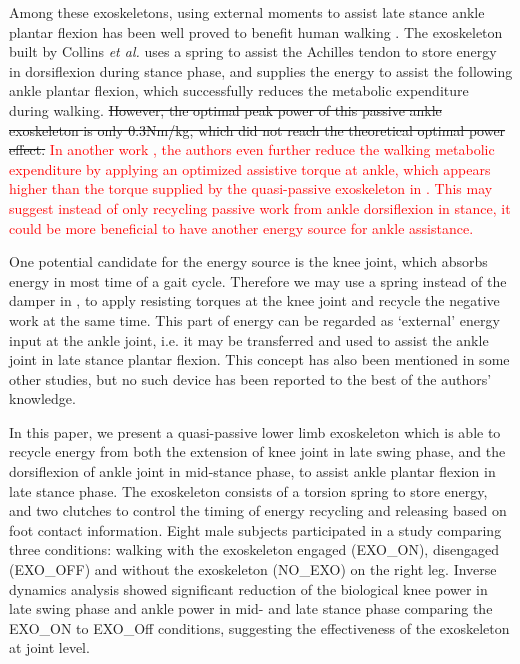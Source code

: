 \documentclass[twocolumn,cleanfoot,10pt]{asme2ej}
\begin{document}
Among these exoskeletons, using external moments to assist late stance ankle plantar flexion has been well proved to benefit human walking \cite{RN5,RN9,RN10,RN11,RN12}.
The exoskeleton built by Collins \emph{et al.}\cite{RN5} uses a spring to assist the Achilles tendon to store energy in dorsiflexion during stance phase, and supplies the energy to assist the following ankle plantar flexion, which successfully reduces the metabolic expenditure during walking.
\sout{However, the optimal peak power of this passive ankle exoskeleton \cite{RN5} is only 0.3Nm/kg, which did not reach the theoretical optimal power effect\cite{zhang2017human}.}
\textcolor{red}{In another work \cite{zhang2017human}, the authors even further reduce the walking metabolic expenditure by applying an optimized assistive torque at ankle, which appears higher than the torque supplied by the quasi-passive exoskeleton in \cite{RN5}.
This may suggest instead of only recycling passive work from ankle dorsiflexion in stance, it could be more beneficial to have another energy source for ankle assistance.}

One potential candidate for the energy source is the knee joint, which absorbs energy in most time of a gait cycle\cite{RN2}.
Therefore we may use a spring instead of the damper in \cite{RN3}, to apply resisting torques at the knee joint and recycle the negative work at the same time.
This part of energy can be regarded as ‘external’ energy input at the ankle joint, i.e. it may be transferred and used to assist the ankle joint in late stance plantar flexion.
This concept has also been mentioned in some other studies\cite{RN3,RN12}, but no such device has been reported to the best of the authors' knowledge.

In this paper, we present a quasi-passive lower limb exoskeleton which is able to recycle energy from both the extension of knee joint in late swing phase, and the dorsiflexion of ankle joint in mid-stance phase, to assist ankle plantar flexion in late stance phase.
The exoskeleton consists of a torsion spring to store energy, and two clutches to control the timing of energy recycling and releasing based on foot contact information.
Eight male subjects participated in a study comparing three conditions: walking with the exoskeleton engaged (EXO\_ON), disengaged (EXO\_OFF) and without the exoskeleton (NO\_EXO) on the right leg.
Inverse dynamics analysis showed significant reduction of the biological knee power in late swing phase and ankle power in mid- and late stance phase comparing the EXO\_ON to EXO\_Off conditions, suggesting the effectiveness of the exoskeleton at joint level.
\end{document}
